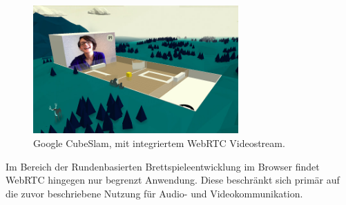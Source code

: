 \begin{figure}[h]
\centering
\includegraphics[width=0.70\textwidth]{bilder/cubeslam.jpg}
\caption{Google CubeSlam, mit integriertem WebRTC Videostream.}
\label{fig:cuubslam}
\end{figure}



Im Bereich der Rundenbasierten Brettspieleentwicklung im Browser findet WebRTC hingegen nur begrenzt Anwendung. Diese beschränkt sich primär auf die zuvor beschriebene Nutzung für Audio- und Videokommunikation.